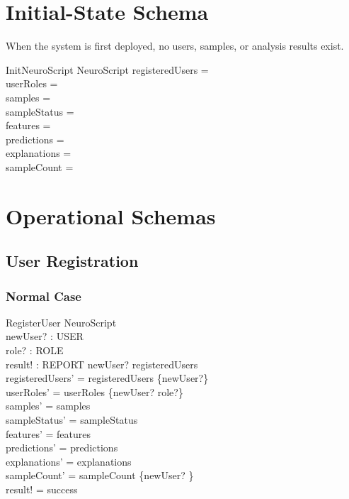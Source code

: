 \documentclass[12pt,a4paper]{article}
\begin{document}
\section{Initial-State Schema}

When the system is first deployed, no users, samples, or analysis results exist.

\begin{schema}{InitNeuroScript}
NeuroScript
\where
registeredUsers = \emptyset \\
userRoles = \emptyset \\
samples = \emptyset \\
sampleStatus = \emptyset \\
features = \emptyset \\
predictions = \emptyset \\
explanations = \emptyset \\
sampleCount = \emptyset
\end{schema}

\section{Operational Schemas}

\subsection{User Registration}

\subsubsection*{Normal Case}

\begin{schema}{RegisterUser}
\Delta NeuroScript \\
newUser? : USER \\
role? : ROLE \\
result! : REPORT
\where
newUser? \notin registeredUsers \\
registeredUsers' = registeredUsers \cup \{newUser?\} \\
userRoles' = userRoles \cup \{newUser? \mapsto role?\} \\
samples' = samples \\
sampleStatus' = sampleStatus \\
features' = features \\
predictions' = predictions \\
explanations' = explanations \\
sampleCount' = sampleCount \oplus \{newUser? \} \\
result! = success
\end{schema}
\end{document}
